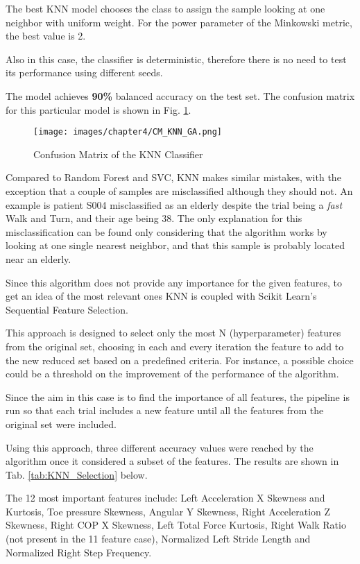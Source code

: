 The best KNN model chooses the class to assign the sample looking at one neighbor with uniform weight. For the power parameter of the Minkowski metric, the best value is 2.

Also in this case, the classifier is deterministic, therefore there is no need to test its performance using different seeds. 

The model achieves \textbf{90\%} balanced accuracy on the test set. The confusion matrix for this particular model is shown in Fig. \ref{fig:CM_KNN_GA}.

\begin{figure}[h!]
    \centering
    \texttt{[image: images/chapter4/CM\_KNN\_GA.png]}
    \caption{Confusion Matrix of the KNN Classifier}
    \label{fig:CM_KNN_GA}
\end{figure}


Compared to Random Forest and SVC, KNN makes similar mistakes, with the exception that a couple of samples are misclassified although they should not. An example is patient S004 misclassified as an elderly despite the trial being a \textit{fast} Walk and Turn, and their age being 38. The only explanation for this misclassification can be found only considering that the algorithm works by looking at one single nearest neighbor, and that this sample is probably located near an elderly.

Since this algorithm does not provide any importance for the given features, to get an idea of the most relevant ones KNN is coupled with Scikit Learn's Sequential Feature Selection. 

This approach is designed to select only the most N (hyperparameter) features from the original set, choosing in each and every iteration the feature to add to the new reduced set based on a predefined criteria.
For instance, a possible choice could be a threshold on the improvement of the performance of the algorithm.

Since the aim in this case is to find the importance of all features, the pipeline is run so that each trial includes a new feature until all the features from the original set were included. 

Using this approach, three different accuracy values were reached by the algorithm once it considered a subset of the features. The results are shown in Tab. \ref{tab:KNN_Selection} below.


The 12 most important features include: Left Acceleration X Skewness and Kurtosis, Toe pressure Skewness, Angular Y Skewness, Right Acceleration Z Skewness, Right COP X Skewness, Left Total Force Kurtosis, Right Walk Ratio (not present in the 11 feature case), Normalized Left Stride Length and Normalized Right Step Frequency.


